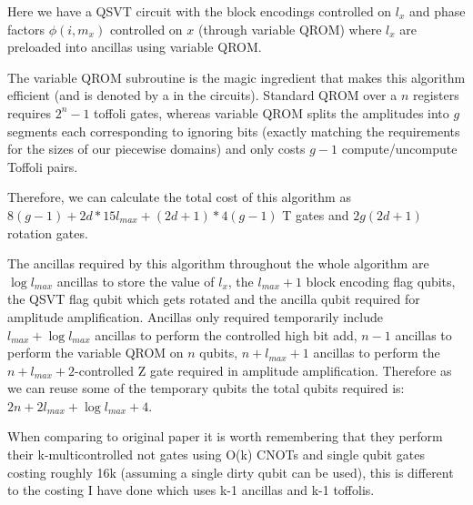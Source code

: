 \documentclass{revtex4-2}
\begin{document}
Here we have a QSVT circuit with the block encodings controlled on $l_x$  and phase factors $\phi(i, m_x)$ controlled on $x$ (through variable QROM) where $l_x$ are preloaded into ancillas using variable QROM.

The variable QROM \cite{Sanders_2020} subroutine is the magic ingredient that makes this algorithm efficient (and is denoted by a \scalebox{1.4}{$\tilde{}$} in the circuits). Standard QROM over a $n$ registers requires $2^n-1$ toffoli gates, whereas variable QROM splits the amplitudes into $g$ segments each corresponding to ignoring bits (exactly matching the requirements for the sizes of our piecewise domains) and only costs $g-1$ compute/uncompute Toffoli pairs.


Therefore, we can calculate the total cost of this algorithm as $8(g-1) + 2d*15l_{max} +(2d+1)*4(g-1)$ T gates and $2g(2d+1)$ rotation gates.

The ancillas required by this algorithm throughout the whole algorithm are $\log l_{max}$ ancillas to store the value of $l_x$, the $l_{max} + 1$ block encoding flag qubits, the QSVT flag qubit which gets rotated and the ancilla qubit required for amplitude amplification. Ancillas only required temporarily include $l_{max} + \log l_{max}$ ancillas to perform the controlled high bit add, $n -1$ ancillas to perform the variable QROM on $n$ qubits, $n+l_{max}+1$ ancillas to perform the $n+l_{max} +2$-controlled Z gate required in amplitude amplification. Therefore as we can reuse some of the temporary qubits the total qubits required is: $2n + 2l_{max} + \log l_{max} + 4$.

When comparing to original paper it is worth remembering that they perform their k-multicontrolled not gates using O(k) CNOTs and single qubit gates costing roughly 16k (assuming a single dirty qubit can be used), this is different to the costing I have done which uses k-1 ancillas and k-1 toffolis.
\end{document}
